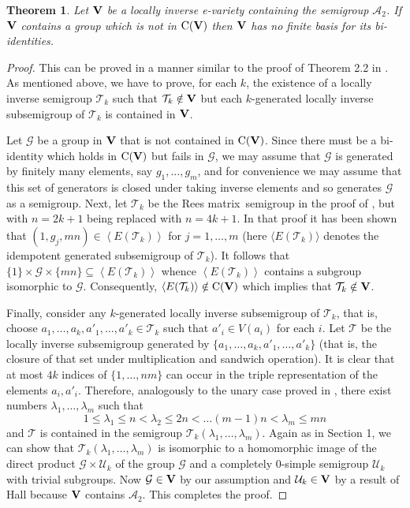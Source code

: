 \documentclass[11pt,reqno]{amsart}
\numberwithin{equation}{section}
\newtheorem{Thm}{Theorem}[section]
\theoremstyle{remark}
\def\pv#1{{\bf #1}}
\def\la{\lambda}
\def\Co{{\mathrm C}}
\def\Rm{Rees matrix}
\begin{document}
\begin{Thm}\label{Theorem 4.4} Let $\pv V$ be a locally inverse
e-variety containing the semigroup $\mathcal{A}_2$. If $\pv V$
contains a group which is not in $\Co(\pv V)$ then $\pv V$ has no
finite basis for its bi-identities.
\end{Thm}

\begin{proof} This can be proved in a manner similar to the proof of
Theorem 2.2 in \cite{adv}.  As mentioned above, we have to prove,
for each $k$, the existence of a locally inverse semigroup
$\mathcal{T}_k$ such that $\mathcal{T}_k\notin \pv V$ but each
$k$-generated locally inverse subsemigroup of $\mathcal{T}_k$ is
contained in $\pv V$.

Let $\mathcal G$ be a group in $\pv V$ that is not contained in
$\Co(\pv V)$. Since there must be a bi-identity which holds in
$\Co(\pv V)$ but fails in $\mathcal G$, we may assume that
$\mathcal G$ is generated by finitely many elements, say
$g_1,\dots, g_m$, and for convenience we may assume that this set
of generators is closed under taking inverse elements and so
generates $\mathcal{G}$ as a semigroup. Next, let $\mathcal{T}_k$
be the \Rm\ semigroup in the proof of \cite[Theorem 2.2]{adv},
but with $n=2k+1$ being replaced with $n=4k+1$. In that proof it
has been shown that $(1,g_j,mn)\in \left<E(\mathcal{T}_k)\right>$
for $j=1,\dots, m$ (here $\langle E(\mathcal{T}_k)\rangle$ denotes
the idempotent generated subsemigroup of $\mathcal{T}_k$). It
follows that $\{1\}\times \mathcal{G}\times\{mn\}\subseteq
\left<E(\mathcal{T}_k)\right>$ whence
$\left<E(\mathcal{T}_k)\right>$ contains a subgroup isomorphic to
$\mathcal{G}$. Consequently, $\left<E(\mathcal{T}_k)\right>\notin
\Co(\pv V)$ which implies that $\mathcal{T}_k\notin \pv V$.

Finally, consider any $k$-generated locally inverse subsemigroup
of $\mathcal{T}_k$, that is, choose
$a_1,\dots,a_k,a'_1,\dots,a'_k\in \mathcal{T}_k$ such that
$a'_i\in V(a_i)$ for each $i$. Let $\mathcal{T}$ be the locally
inverse subsemigroup generated by
$\{a_1,\dots,a_k,a'_1,\dots,a'_k\}$ (that is, the closure of that
set under multiplication and sandwich operation). It is clear that
at most $4k$ indices of $\{1,\dots,nm\}$ can occur in the triple
representation of the elements $a_i,a'_i$. Therefore, analogously
to the unary case proved in \cite[Theorem 2.2 ??]{adv}, there exist numbers
$\la_1,\dots,\la_m$ such that
$$1\le\la_1\le n<\la_2\le 2n < \dots (m-1)n<\la_m\le mn$$
and $\mathcal{T}$ is contained in the semigroup
$\mathcal{T}_k(\la_1,\dots,\la_m)$. Again as in
Section 1, we can show that $\mathcal{T}_k(\la_1,\dots,\la_m)$ is
isomorphic to a homomorphic image of the direct product
$\mathcal{G}\times \mathcal{U}_k$ of the group $\mathcal G$ and a
completely 0-simple semigroup $\mathcal{U}_k$ with trivial
subgroups. Now $\mathcal{G}\in \pv V$ by our assumption and
$\mathcal{U}_k\in \pv V$ by a result of Hall \cite{H2} because
$\pv V$ contains $\mathcal{A}_2$. This completes the proof.
\end{proof}
\end{document}
